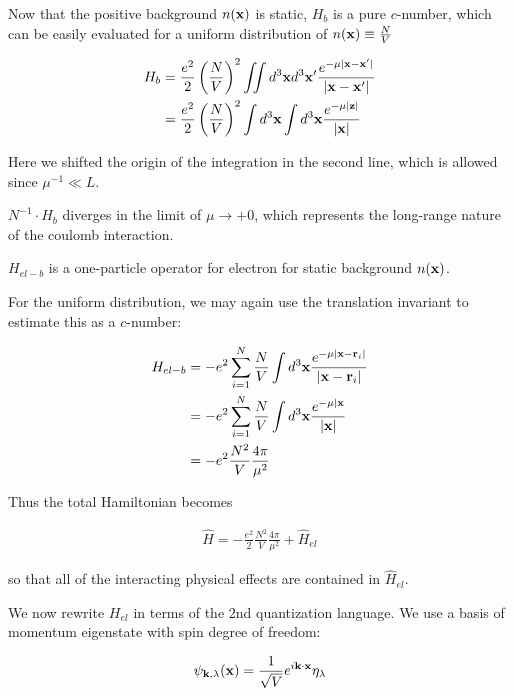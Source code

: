 Now that the positive background $n(\bf x)$ is static, $H_b$ is a pure $c$-number, which can be easily evaluated for a uniform distribution of $n({\bf x})\equiv\frac{N}{V}$

\begin{align}
\begin{split}
H_b &=\frac{e^2}{2}\left(\frac{N}{V}\right)^2\iint d^3{\bf x}d^3{\bf x'}\frac{e^{-\mu|\bf x-x'|}}{|\bf x-x'|}\\
&=\frac{e^2}{2}\left(\frac{N}{V}\right)^2\int d^3{\bf x}\int d^3{\bf x}\frac{e^{-\mu|\bf z|}}{|\bf x|}
\end{split}
\end{align}%

Here we shifted the origin of the integration in the second line, which is allowed since $\mu^{-1}\ll L$. 

$N^{-1}\cdot H_b$ diverges in the limit of $\mu\to +0$, which represents the long-range nature of the coulomb interaction. 

$H_{el-b}$ is a one-particle operator for electron for static background $n({\bf x})$. 

For the uniform distribution, we may again use the translation invariant to estimate this as a $c$-number:

\begin{align}
\begin{split}
H_{el-b}&=-e^2\sum_{i=1}^N\frac{N}{V}\int d^3{\bf x}\frac{e^{-\mu|{\bf x-r}_i|}}{|{\bf x-r}_i|}\\
&=-e^2\sum_{i=1}^N\frac{N}{V}\int d^3{\bf x}\frac{e^{-\mu|{\bf x}}}{|{\bf x}|}\\
&=-e^2\frac{N^2}{V}\frac{4\pi}{\mu^2}
\end{split}
\end{align}

Thus the total Hamiltonian becomes 

\begin{align}\label{eq1.8.10}
\hat{H}=-\frac{e^2}{2}\frac{N^2}{V}\frac{4\pi}{\mu^2}+\hat{H}_{el}
\end{align}

so that all of the interacting physical effects are contained in $\hat{H}_{el}$. 

We now rewrite $H_{el}$ in terms of the $2$nd quantization language. We use a basis of momentum eigenstate with spin degree of freedom:

\[\psi_{{\bf k},\lambda}({\bf x})=\frac{1}{\sqrt{V}}e^{i\bf k\cdot x}\eta_\lambda \]


